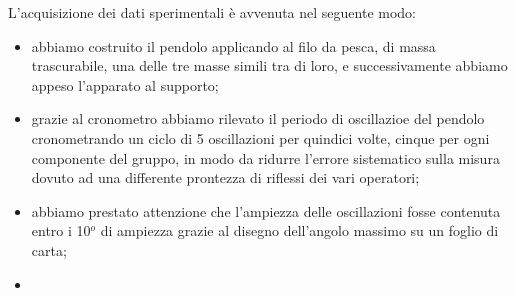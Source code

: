 L'acquisizione dei dati sperimentali è avvenuta nel seguente modo:
\begin{itemize}
	\item{abbiamo costruito il pendolo applicando al filo da pesca, di massa trascurabile, una delle tre masse simili tra di loro, e successivamente abbiamo appeso l'apparato al supporto;}
	\item{grazie al cronometro abbiamo rilevato il periodo di oscillazioe del pendolo cronometrando un ciclo di 5 oscillazioni per quindici volte, cinque per ogni componente del gruppo, in modo da ridurre l'errore sistematico sulla misura dovuto ad una differente prontezza di riflessi dei vari operatori;}
	\item{abbiamo prestato attenzione che l'ampiezza delle oscillazioni fosse contenuta entro i 10$^o$ di ampiezza grazie al disegno dell'angolo massimo su un foglio di carta;}
	\item{}
\end{itemize}
